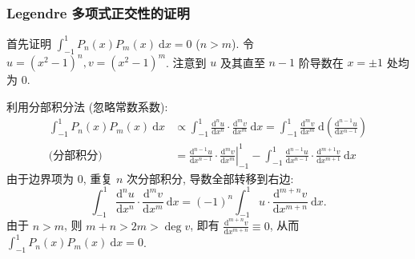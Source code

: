 
\begin{frame}
\frametitle{Legendre 多项式正交性的证明}

首先证明 $\int_{-1}^1 P_n(x) P_m(x) ~ \mathrm{d}x = 0$ ($n > m$).
令 $u = (x^2-1)^n, v = (x^2-1)^m$. 注意到 $u$ 及其直至 $n-1$ 阶导数在 $x=\pm 1$ 处均为 0.

\vspace{0.5em}
\small
利用分部积分法 (忽略常数系数):
\begin{align*}
\int_{-1}^1 P_n(x) P_m(x) ~ \mathrm{d}x & \propto \int_{-1}^1 \frac{\mathrm{d}^n u}{\mathrm{d}x^n} \cdot \frac{\mathrm{d}^m v}{\mathrm{d}x^m} ~ \mathrm{d}x = \int_{-1}^1 \frac{\mathrm{d}^m v}{\mathrm{d}x^m} ~ \mathrm{d} \left( \frac{\mathrm{d}^{n-1} u}{\mathrm{d}x^{n-1}} \right) \\
\text{(分部积分)} \quad & = \left. \frac{\mathrm{d}^{n-1} u}{\mathrm{d}x^{n-1}} \cdot \frac{\mathrm{d}^m v}{\mathrm{d}x^m} \right|_{-1}^1 - \int_{-1}^1 \frac{\mathrm{d}^{n-1} u}{\mathrm{d}x^{n-1}} \cdot \frac{\mathrm{d}^{m+1} v}{\mathrm{d}x^{m+1}} ~ \mathrm{d}x
\end{align*}
由于边界项为 0, 重复 $n$ 次分部积分, 导数全部转移到右边:
\[
\int_{-1}^1 \frac{\mathrm{d}^n u}{\mathrm{d}x^n} \cdot \frac{\mathrm{d}^m v}{\mathrm{d}x^m} ~ \mathrm{d}x = (-1)^n \int_{-1}^1 u \cdot \frac{\mathrm{d}^{m+n} v}{\mathrm{d}x^{m+n}} ~ \mathrm{d}x.
\]
由于 $n > m$, 则 $m + n > 2m > \deg v$, 即有 $\frac{\mathrm{d}^{m+n} v}{\mathrm{d}x^{m+n}} \equiv 0$, 从而 $\int_{-1}^1 P_n(x) P_m(x) ~ \mathrm{d}x = 0$.

\end{frame}


